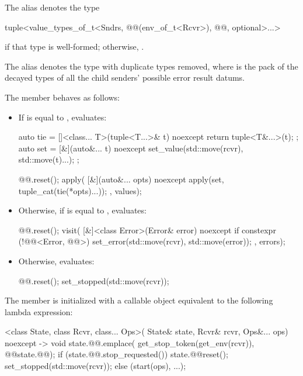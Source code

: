 \pnum
The alias  denotes the type
\begin{codeblock}
tuple<value_types_of_t<Sndrs, @@(env_of_t<Rcvr>), @@, optional>...>
\end{codeblock}
if that type is well-formed; otherwise, .

\pnum
The alias  denotes
the type 
with duplicate types removed,
where  is the pack of the decayed types
of all the child senders' possible error result datums.

\pnum
The member
behaves as follows:
\begin{itemize}
\item
If  is equal to ,
evaluates:
\begin{codeblock}
auto tie = []<class... T>(tuple<T...>& t) noexcept { return tuple<T&...>(t); };
auto set = [&](auto&... t) noexcept { set_value(std::move(rcvr), std::move(t)...); };

@@.reset();
apply(
  [&](auto&... opts) noexcept {
    apply(set, tuple_cat(tie(*opts)...));
  },
  values);
\end{codeblock}
\item
Otherwise,
if  is equal to ,
evaluates:
\begin{codeblock}
@@.reset();
visit(
  [&]<class Error>(Error& error) noexcept {
    if constexpr (!@@<Error, @@>) {
      set_error(std::move(rcvr), std::move(error));
    }
  },
  errors);
\end{codeblock}
\item
Otherwise, evaluates:
\begin{codeblock}
@@.reset();
set_stopped(std::move(rcvr));
\end{codeblock}
\end{itemize}

\pnum
The member 
is initialized with a callable object
equivalent to the following lambda expression:
\begin{codeblock}
[]<class State, class Rcvr, class... Ops>(
    State& state, Rcvr& rcvr, Ops&... ops) noexcept -> void {
  state.@@.emplace(
    get_stop_token(get_env(rcvr)),
    @@{state.@@});
  if (state.@@.stop_requested()) {
    state.@@reset();
    set_stopped(std::move(rcvr));
  } else {
    (start(ops), ...);
  }
}
\end{codeblock}

